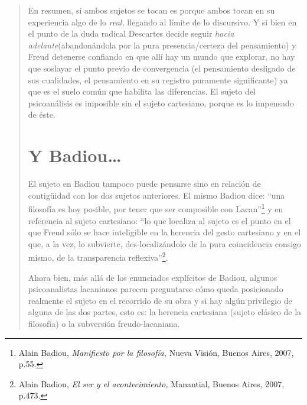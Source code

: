 \begin{quote}
En resumen, si ambos sujetos se tocan es porque ambos tocan en su experiencia algo de lo \emph{real,} llegando al límite de lo discursivo. Y si bien en el punto de la duda radical Descartes decide seguir \emph{hacia adelante}(abandonándola por la pura presencia/certeza del pensamiento) y Freud detenerse confiando en que allí hay un mundo que explorar, no hay que soslayar el punto previo de convergencia (el pensamiento desligado de sus cualidades, el pensamiento en su registro puramente significante) ya que es el suelo común que habilita las diferencias. El sujeto del psicoanálisis es imposible sin el sujeto cartesiano, porque es lo impensado de éste.

\section{Y Badiou\dots}

El sujeto en Badiou tampoco puede pensarse sino en relación de contigüidad con los dos sujetos anteriores. El mismo Badiou dice: \enquote{una filosofía es hoy posible, por tener que ser composible con Lacan}\footnote{Alain Badiou, \emph{Manifiesto por la filosofía,} Nueva Visión, Buenos Aires, 2007, p.55.} y en referencia al sujeto cartesiano: \enquote{lo que localiza al sujeto es el punto en el que Freud sólo se hace inteligible en la herencia del gesto cartesiano y en el que, a la vez, lo subvierte, des-localizándolo de la pura coincidencia consigo mismo, de la transparencia reflexiva}\footnote{Alain Badiou, \emph{El ser y el acontecimiento,} Manantial, Buenos Aires, 2007, p.473.}.

Ahora bien, más allá de los enunciados explícitos de Badiou, algunos psicoanalistas lacanianos parecen preguntarse cómo queda posicionado realmente el sujeto en el recorrido de su obra y si hay algún privilegio de alguna de las dos partes, esto es: la herencia cartesiana (sujeto clásico de la filosofía) o la subversión freudo-lacaniana.


\end{quote}
